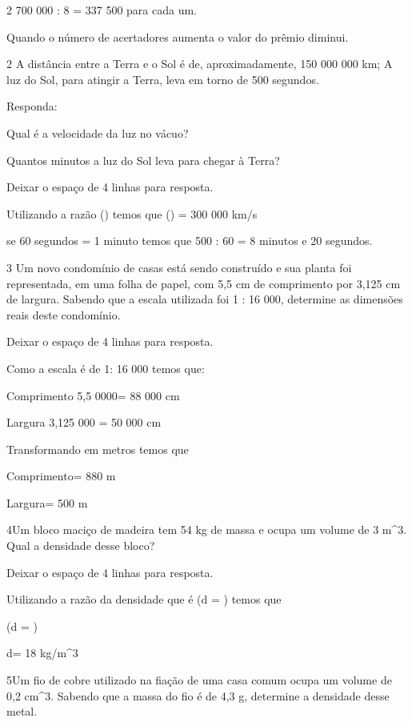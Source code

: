 2 700 000 : 8 = 337 500 para cada um.

\item Quando o número de acertadores aumenta o valor do prêmio diminui.

\num{2} A distância entre a Terra e o Sol é de, aproximadamente, 150 000 000
km; A luz do Sol, para atingir a Terra, leva em torno de 500 segundos.

Responda:

\item Qual é a velocidade da luz no vácuo?
\item Quantos minutos a luz do Sol leva para chegar à Terra?

Deixar o espaço de 4 linhas para resposta.

\item Utilizando a razão () temos que
() = 300 000 km/s

\item se 60 segundos = 1 minuto temos que 500 : 60 = 8 minutos e 20
segundos.

\num{3} Um novo condomínio de casas está sendo construído e sua planta foi
representada, em uma folha de papel, com 5,5 cm de comprimento por 3,125
cm de largura. Sabendo que a escala utilizada foi 1 : 16 000, determine
as dimensões reais deste condomínio.

Deixar o espaço de 4 linhas para resposta.

Como a escala é de 1: 16 000 temos que:

Comprimento 5,5 0000= 88 000 cm

Largura 3,125 000 = 50 000 cm

Transformando em metros temos que

Comprimento= 880 m

Largura= 500 m

\num{4}\times Um bloco maciço de madeira tem 54 kg de massa e ocupa um volume de
3 m^3. Qual a densidade desse bloco?

Deixar o espaço de 4 linhas para resposta.

Utilizando a razão da densidade que é (d = ) temos que

(d = )

d= 18 kg/m^3

\num{5}\times Um fio de cobre utilizado na fiação de uma casa comum ocupa um
volume de 0,2 cm^3. Sabendo que a massa do fio é de 4,3 g, determine a
densidade desse metal.


